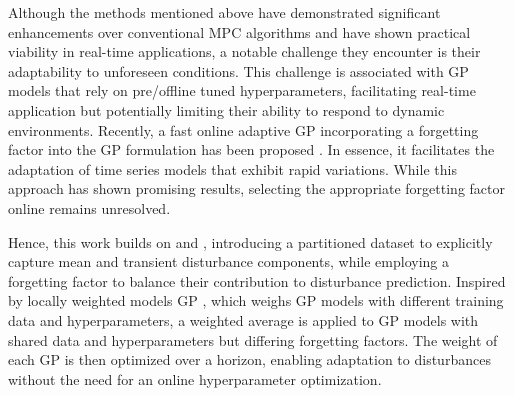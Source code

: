Although the methods mentioned above have demonstrated significant enhancements over conventional \ac{MPC} algorithms and have shown practical viability in real-time applications, a notable challenge they encounter is their adaptability to unforeseen conditions. This challenge is associated with \ac{GP} models that rely on pre/offline tuned hyperparameters, facilitating real-time application but potentially limiting their ability to respond to dynamic environments. Recently, a fast online adaptive \ac{GP} incorporating a forgetting factor into the  \ac{GP} formulation has been proposed \cite{asgp}. In essence, it facilitates the adaptation of time series models that exhibit rapid variations. While this approach has shown promising results, selecting the appropriate forgetting factor online remains unresolved.

Hence, this work builds on \cite{mohit_gp} and \cite{asgp}, introducing a partitioned dataset to explicitly capture mean and transient disturbance components, while employing a forgetting factor to balance their contribution to disturbance prediction. Inspired by locally weighted models \ac{GP} \cite{local_gp}, which weighs \ac{GP} models with different training data and hyperparameters, a weighted average is applied to \ac{GP} models with shared data and hyperparameters but differing forgetting factors. The weight of each \ac{GP}  is then optimized over a horizon, enabling adaptation to disturbances without the need for an online hyperparameter optimization.





